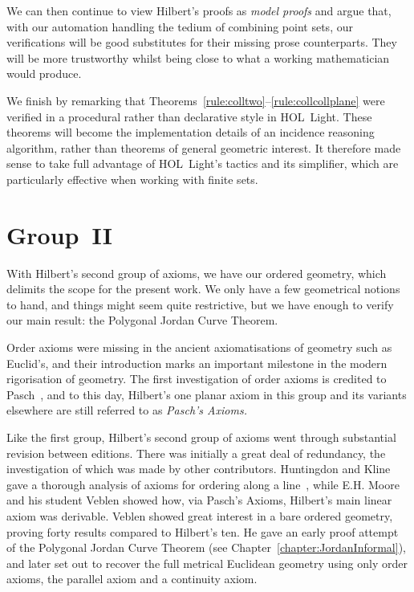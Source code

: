 We can then continue to view Hilbert's proofs as \emph{model proofs} and argue that, with our automation handling the tedium of combining point sets, our verifications will be good substitutes for their missing prose counterparts. They will be more trustworthy whilst being close to what a working mathematician would produce.

We finish by remarking that Theorems~\ref{rule:colltwo}--\ref{rule:collcollplane} were verified in a procedural rather than declarative style in HOL~Light. These theorems will become the implementation details of an incidence reasoning algorithm, rather than theorems of general geometric interest. It therefore made sense to take full advantage of HOL~Light's tactics and its simplifier, which are particularly effective when working with finite sets.

\section{Group~II}
With Hilbert's second group of axioms, we have our ordered geometry, which delimits the scope for the present work. We only have a few geometrical notions to hand, and things might seem quite restrictive, but we have enough to verify our main result: the Polygonal Jordan Curve Theorem.

Order axioms were missing in the ancient axiomatisations of geometry such as Euclid's, and their introduction marks an important milestone in the modern rigorisation of geometry. The first investigation of order axioms is credited to Pasch~\cite{AxiomaticsOrderedGeometry}, and to this day, Hilbert's one planar axiom in this group and its variants elsewhere are still referred to as \emph{Pasch's Axioms.}

Like the first group, Hilbert's second group of axioms went through substantial revision between editions. There was initially a great deal of redundancy, the investigation of which was made by other contributors. Huntingdon and Kline gave a thorough analysis of axioms for ordering along a line~\cite{AnalysisBetweenness}, while E.H. Moore and his student Veblen showed how, via Pasch's Axioms, Hilbert's main linear axiom was derivable. Veblen showed great interest in a bare ordered geometry, proving forty results compared to Hilbert's ten. He gave an early proof attempt of the Polygonal Jordan Curve Theorem (see Chapter~\ref{chapter:JordanInformal}), and later set out to recover the full metrical Euclidean geometry using only order axioms, the parallel axiom and a continuity axiom.

